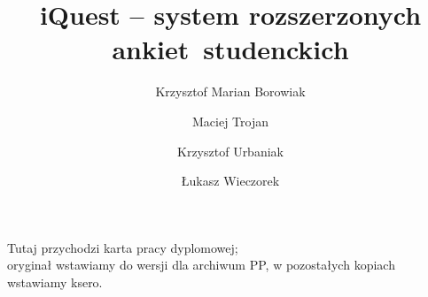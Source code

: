 \documentclass[polish,bachelor,a4paper,oneside]{ppfcmthesis}
\author{%
   Krzysztof Marian Borowiak \album{94269} \and 
   Maciej Trojan \album{94378} \and 
   Krzysztof Urbaniak \album{94381} \and 
   Łukasz Wieczorek \album{94385}}
\title{iQuest -- system rozszerzonych ankiet~studenckich}                   %
\begin{document}
\frontmatter\pagestyle{empty}%
\maketitle\cleardoublepage%

\thispagestyle{empty}\vspace*{\fill}%
\begin{center}Tutaj przychodzi karta pracy dyplomowej;\\oryginał wstawiamy do wersji dla archiwum PP, w pozostałych kopiach wstawiamy ksero.\end{center}%
\vfill\cleardoublepage%

\pagestyle{ppfcmthesis}%
\tableofcontents* \cleardoublepage%

\mainmatter%










\cleardoublepage\appendix%




{\raggedright\sloppy\small}

\ppcolophon
\end{document}
